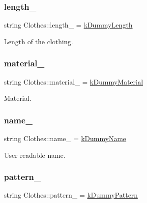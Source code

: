 \subsubsection{\texorpdfstring{length\+\_\+}{length\_}}
{\footnotesize\ttfamily string Clothes\+::length\+\_\+ = \mbox{\hyperlink{clothes_8h_a1624256dcecfb0995a74c36142593770}{k\+Dummy\+Length}}\hspace{0.3cm}{\ttfamily [protected]}}



Length of the clothing. 

\mbox{\label{classClothes_adbb9ed311f14ccbb1e4fe0e8378a95d4}} 
\subsubsection{\texorpdfstring{material\+\_\+}{material\_}}
{\footnotesize\ttfamily string Clothes\+::material\+\_\+ = \mbox{\hyperlink{clothes_8h_a9df1268c6668ae4e2a728ccf032cc33d}{k\+Dummy\+Material}}\hspace{0.3cm}{\ttfamily [protected]}}



Material. 

\mbox{\label{classClothes_a7f2275aaae24224d60c48af922c31b65}} 
\subsubsection{\texorpdfstring{name\+\_\+}{name\_}}
{\footnotesize\ttfamily string Clothes\+::name\+\_\+ = \mbox{\hyperlink{clothes_8h_adba739b5125fd5a4066ec0ef063c0657}{k\+Dummy\+Name}}\hspace{0.3cm}{\ttfamily [protected]}}



User readable name. 

\mbox{\label{classClothes_a1d40145a4eb6d28441f112f030ab5d35}} 
\subsubsection{\texorpdfstring{pattern\+\_\+}{pattern\_}}
{\footnotesize\ttfamily string Clothes\+::pattern\+\_\+ = \mbox{\hyperlink{clothes_8h_a2e72ae4d77adb7bc9cbecf4dea1e9e22}{k\+Dummy\+Pattern}}\hspace{0.3cm}{\ttfamily [protected]}}



